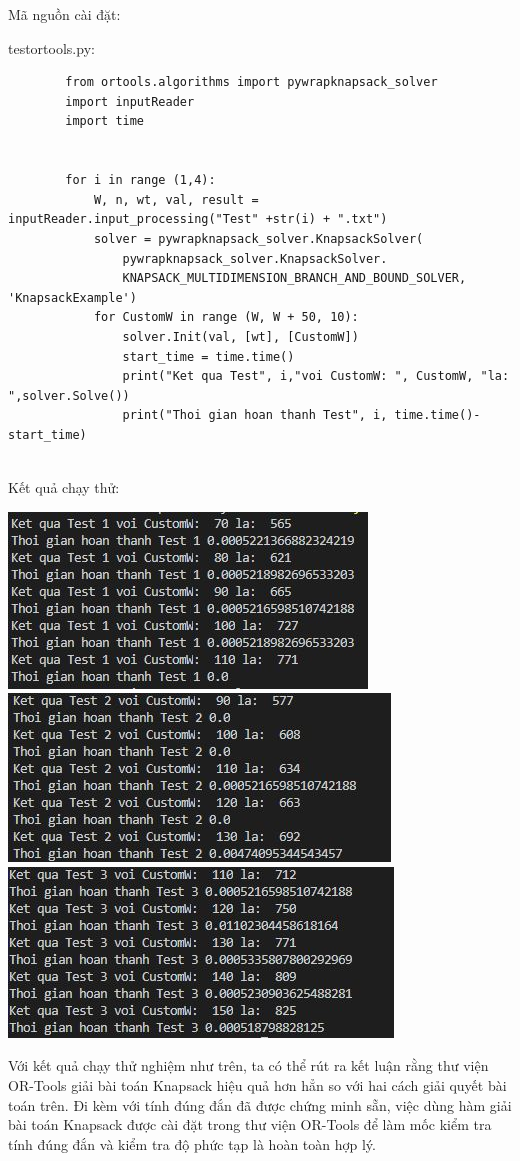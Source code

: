 \documentclass[12pt,a4paper]{report}
\begin{document}
    Mã nguồn cài đặt:

    testortools.py:

    \begin{lstlisting}
        from ortools.algorithms import pywrapknapsack_solver
        import inputReader
        import time


        for i in range (1,4):
            W, n, wt, val, result = inputReader.input_processing("Test" +str(i) + ".txt")
            solver = pywrapknapsack_solver.KnapsackSolver(
                pywrapknapsack_solver.KnapsackSolver.
                KNAPSACK_MULTIDIMENSION_BRANCH_AND_BOUND_SOLVER, 'KnapsackExample')
            for CustomW in range (W, W + 50, 10):
                solver.Init(val, [wt], [CustomW])
                start_time = time.time()
                print("Ket qua Test", i,"voi CustomW: ", CustomW, "la: ",solver.Solve())
                print("Thoi gian hoan thanh Test", i, time.time()-start_time)


    \end{lstlisting}

    Kết quả chạy thử:

    \begin{center}
        \includegraphics{OT1.JPG}
        \includegraphics{OT2.JPG}
        \includegraphics{OT3.JPG}
        

        
        Với kết quả chạy thử nghiệm như trên, ta có thể rút ra kết luận rằng thư viện 
        OR-Tools giải bài toán Knapsack hiệu quả hơn hẳn so với hai cách giải quyết bài
        toán trên. Đi kèm với tính đúng đắn đã được chứng minh sẵn, việc dùng hàm 
        giải bài toán Knapsack được cài đặt trong thư viện OR-Tools để làm mốc kiểm tra 
        tính đúng đắn và kiểm tra độ phức tạp là hoàn toàn hợp lý.
    \end{center}
\end{document}
